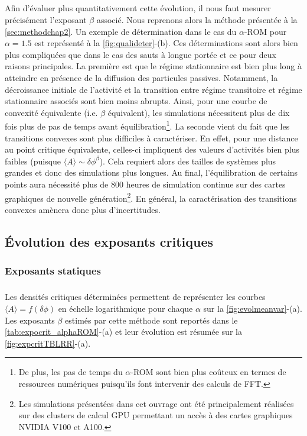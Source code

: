 \subparagraph{}Afin d'évaluer plus quantitativement cette évolution, il nous faut mesurer précisément l'exposant $\beta$ associé. Nous reprenons alors la méthode présentée à la \autoref{sec:methodchap2}. Un exemple de détermination dans le cas du $\alpha$-ROM pour $\alpha = 1.5$ est représenté à la \autoref{fig:qualideter}-(b). Ces déterminations sont alors bien plus compliquées que dans le cas des sauts à longue portée et ce pour deux raisons principales. La première est que le régime stationnaire est bien plus long à atteindre en présence de la diffusion des particules passives. Notamment, la décroissance initiale de l'activité et la transition entre régime transitoire et régime stationnaire associés sont bien moins abrupts. Ainsi, pour une courbe de convexité équivalente (i.e. $\beta$ équivalent), les simulations nécessitent plus de dix fois plus de pas de temps avant équilibration\footnote{De plus, les pas de temps du $\alpha$-ROM sont bien plus coûteux en termes de ressources numériques puisqu'ils font intervenir des calculs de FFT.}. La seconde vient du fait que les transitions convexes sont plus difficiles à caractériser. En effet, pour une distance au point critique équivalente, celles-ci impliquent des valeurs d'activités bien plus faibles (puisque $\langle A \rangle \sim \delta\phi^\beta$). Cela requiert alors des tailles de systèmes plus grandes et donc des simulations plus longues. Au final, l'équilibration de certains points aura nécessité plus de 800 heures de simulation continue sur des cartes graphiques de nouvelle génération\footnote{Les simulations présentées dans cet ouvrage ont été principalement réalisées sur des clusters de calcul GPU permettant un accès à des cartes graphiques NVIDIA V100 et A100.}. En général, la caractérisation des transitions convexes amènera donc plus d'incertitudes.

\subsection{Évolution des exposants critiques}

\subsubsection{Exposants statiques}

\label{sec:TBLRRStat}

\subparagraph{}Les densités critiques déterminées permettent de représenter les courbes $\langle A \rangle = f(\delta\phi)$ en échelle logarithmique pour chaque $\alpha$ sur la \autoref{fig:evolmeanvar}-(a). Les exposants $\beta$ estimés par cette méthode sont reportés dans le \autoref{tab:expocrit_alphaROM}-(a) et leur évolution est résumée sur la \autoref{fig:expcritTBLRR}-(a).

